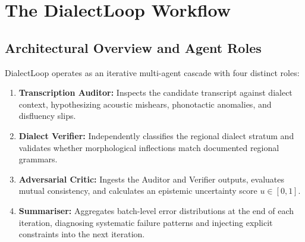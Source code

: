 \section{The DialectLoop Workflow}
\label{sec:workflow}

\subsection{Architectural Overview and Agent Roles}
DialectLoop operates as an iterative multi-agent cascade with four distinct roles:
\begin{enumerate}
    \item \textbf{Transcription Auditor:} Inspects the candidate transcript against dialect context, hypothesizing acoustic mishears, phonotactic anomalies, and disfluency slips.
    \item \textbf{Dialect Verifier:} Independently classifies the regional dialect stratum and validates whether morphological inflections match documented regional grammars.
    \item \textbf{Adversarial Critic:} Ingests the Auditor and Verifier outputs, evaluates mutual consistency, and calculates an epistemic uncertainty score $u \in [0, 1]$.
    \item \textbf{Summariser:} Aggregates batch-level error distributions at the end of each iteration, diagnosing systematic failure patterns and injecting explicit constraints into the next iteration.
\end{enumerate}


